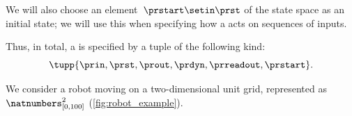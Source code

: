 We will also choose an element~$\prstart \setin \prst$ of the state space as an initial state; we will use this when specifying how a  acts on sequences of inputs.

Thus, in total, a  is specified by a tuple of the following kind:
\begin{equation}
    \label{eq:moore-tuple}
    \tupp{\prin,\prst,\prout,\prdyn,\prreadout,\prstart}.
\end{equation}


\begin{example}
    \label{exa:robot_on_a_grid}
   
    We consider a robot moving on a two-dimensional unit grid, represented as $\natnumbers^2_{[0,100]}$ (\cref{fig:robot_example}).
    \begin{marginfigure}
        \centering
        \caption{Robot on a grid example. }
        \label{fig:robot_example_again}
    \end{marginfigure}


\end{example}
